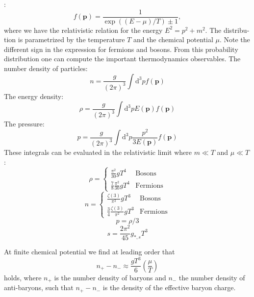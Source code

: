 \documentclass[master,       %
               twoside,        %
               BCOR10mm,       %
               english,ngerman, %
               ]{GAUBM}
\begin{document}
\begin{otherlanguage}{english}
{}:
\begin{equation}
	f(\mathbf{p}) = \frac{1}{\exp((E - \mu) / T) \pm 1},
\end{equation}
where we have the relativistic relation for the energy $E^2 = p^2 + m^2$. The distribution is parametrized by the temperature $T$ and the chemical potential $\mu$.
Note the different sign in the expression for fermions and bosons.
From this probability distribution one can compute the important thermodynamics observables.
The number density of particles:
\begin{equation}
	n = \frac{g}{(2\pi)^3} \int \mathrm{d}^3 p f(\mathbf{p})
\end{equation}
The energy density:
\begin{equation}
	\rho = \frac{g}{(2\pi)^3} \int \mathrm{d}^3 p E(\mathbf{p}) f(\mathbf{p})
\end{equation}
The pressure:
\begin{equation}
	p = \frac{g}{(2\pi)^3} \int \mathrm{d}^3 p \frac{p^2}{3E(\mathbf{p})} f(\mathbf{p})
\end{equation}
These integrals can be evaluated in the relativistic limit where $m \ll T$ and $\mu \ll T$:
\begin{equation}
	\rho = \begin{cases}
		\frac{\pi^2}{30} g T^4 & \text{Bosons} \\
		\frac{7}{8} \frac{\pi^2}{30} g T^4 & \text{Fermions}
	\end{cases}
\end{equation}
\begin{equation}
	\label{eq:number_density}
	n = \begin{cases}
		\frac{\zeta(3)}{\pi^2} g T^3 & \text{Bosons} \\
		\frac{3}{4} \frac{\zeta(3)}{\pi^2} g T^3 & \text{Fermions}
	\end{cases}
\end{equation}
\begin{equation}
	p = \rho / 3
\end{equation}
\begin{equation}
	s = \frac{2 \pi^2}{45} g_{*, s} T^3
\end{equation}

At finite chemical potential we find at leading order that 
\begin{equation}
	n_+ - n_- \approx \frac{g T^3}{6} \left( \frac{\mu}{T} \right)
\end{equation}
holds, where $n_+$ is the number density of baryons and $n_-$ the number density of anti-baryons, such that $n_+ - n_-$ is the density of the effective baryon charge.


\end{otherlanguage}
\end{document}
